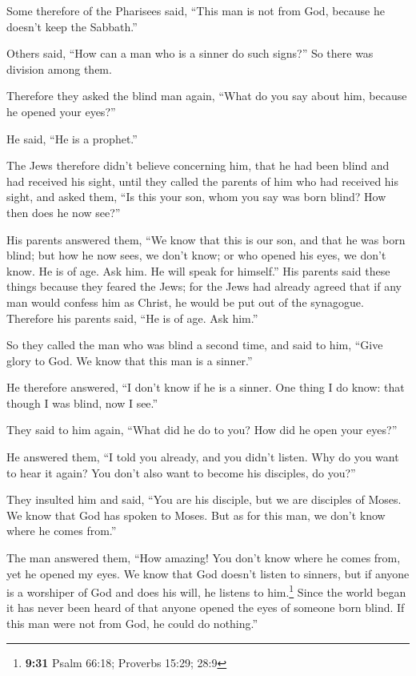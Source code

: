  Some therefore of the Pharisees said, ``This man is not
from God, because he doesn't keep the Sabbath.''

Others said, ``How can a man who is a sinner do such signs?'' So there
was division among them.

 Therefore they asked the blind man again, ``What do you
say about him, because he opened your eyes?''

He said, ``He is a prophet.''

 The Jews therefore didn't believe concerning him, that
he had been blind and had received his sight, until they called the
parents of him who had received his sight,  and asked
them, ``Is this your son, whom you say was born blind? How then does he
now see?''

 His parents answered them, ``We know that this is our
son, and that he was born blind;  but how he now sees, we
don't know; or who opened his eyes, we don't know. He is of age. Ask
him. He will speak for himself.''  His parents said these
things because they feared the Jews; for the Jews had already agreed
that if any man would confess him as Christ, he would be put out of the
synagogue.  Therefore his parents said, ``He is of age.
Ask him.''

 So they called the man who was blind a second time, and
said to him, ``Give glory to God. We know that this man is a sinner.''

 He therefore answered, ``I don't know if he is a sinner.
One thing I do know: that though I was blind, now I see.''

 They said to him again, ``What did he do to you? How did
he open your eyes?''

 He answered them, ``I told you already, and you didn't
listen. Why do you want to hear it again? You don't also want to become
his disciples, do you?''

 They insulted him and said, ``You are his disciple, but
we are disciples of Moses.  We know that God has spoken
to Moses. But as for this man, we don't know where he comes from.''

 The man answered them, ``How amazing! You don't know
where he comes from, yet he opened my eyes.  We know that
God doesn't listen to sinners, but if anyone is a worshiper of God and
does his will, he listens to him.\footnote{\textbf{9:31} Psalm 66:18;
  Proverbs 15:29; 28:9}  Since the world began it has
never been heard of that anyone opened the eyes of someone born blind.
 If this man were not from God, he could do nothing.''

